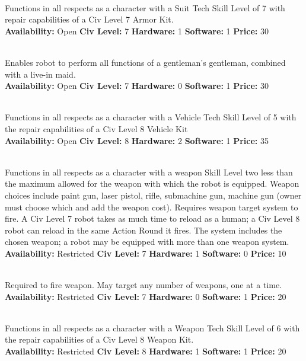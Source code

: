 \\
Functions in all respects as a character with a Suit Tech Skill Level of 7 with repair capabilities of a Civ Level 7 Armor Kit. 
\\
\textbf{Availability:} Open \textbf{Civ Level:} 7 \textbf{Hardware:} 1 \textbf{Software:} 1 \textbf{Price:} 30 

\\
Enables robot to perform all functions of a gentleman's gentleman, combined with a live-in maid. 
\\
\textbf{Availability:} Open \textbf{Civ Level:} 7 \textbf{Hardware:} 0 \textbf{Software:} 1 \textbf{Price:} 30 

\\
Functions in all respects as a character with a Vehicle Tech Skill Level of 5 with the repair capabilities of a Civ Level 8 Vehicle Kit 
\\
\textbf{Availability:} Open \textbf{Civ Level:} 8 \textbf{Hardware:} 2 \textbf{Software:} 1 \textbf{Price:} 35 


\\
Functions in all respects as a character with a weapon Skill Level two
less than the maximum allowed for the weapon with which the robot is
equipped. Weapon choices include paint gun, laser pistol, rifle,
submachine gun, machine gun (owner must choose which and add the
weapon cost). Requires weapon target system to fire. A Civ Level 7
robot takes as much time to reload as a human; a Civ Level 8 robot can
reload in the same Action Round it fires. The system includes the
chosen weapon; a robot may be equipped with more than one weapon
system.
\\
\textbf{Availability:} Restricted \textbf{Civ Level:} 7
\textbf{Hardware:} 1 \textbf{Software:} 0 \textbf{Price:} 10

\\
Required to fire weapon. May target any number of weapons, one at a time. 
\\
\textbf{Availability:} Restricted \textbf{Civ Level:} 7 \textbf{Hardware:} 0 \textbf{Software:} 1 \textbf{Price:} 20 

\\
Functions in all respects as a character with a Weapon Tech Skill Level of 6 with the repair capabilities of a Civ Level 8 Weapon Kit. 
\\
\textbf{Availability:} Restricted \textbf{Civ Level:} 8 \textbf{Hardware:} 1 \textbf{Software:} 1 \textbf{Price:} 20 

